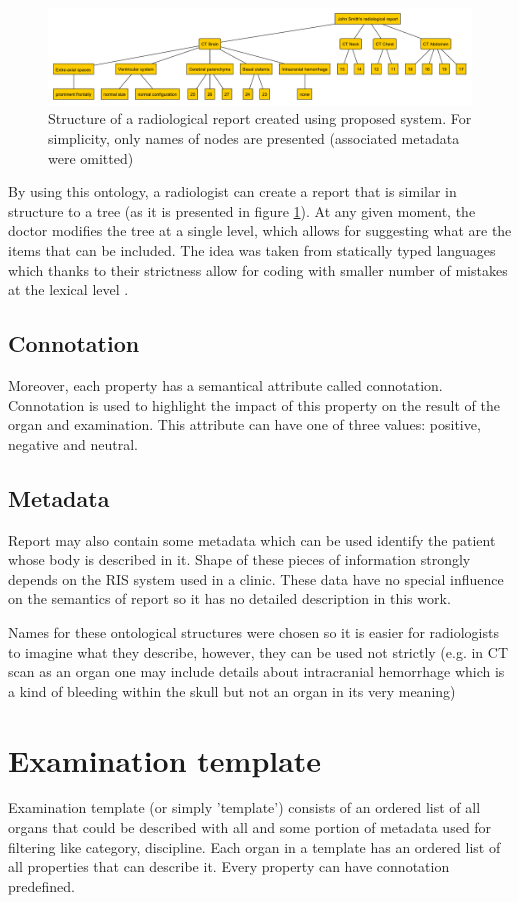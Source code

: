 \documentclass[12pt, twoside, openany]{report}
\theoremstyle{definition}
\begin{document}
\begin{figure}
    \centering
    \includegraphics[width=\linewidth]{report-tree.pdf}
    \caption{Structure of a radiological report created \label{fig:report-tree} using proposed system. For simplicity, only names of nodes are presented (associated metadata were omitted)}
\end{figure}

By using this ontology, a radiologist can create a report that is similar in structure to a tree (as it is presented in figure \ref{fig:report-tree}). At any given moment, the doctor modifies the tree at a single level, which allows for suggesting what are the items that can be included. The idea was taken from statically typed languages which thanks to their strictness allow for coding with smaller number of mistakes at the lexical level \cite{static-lang}.

\subsection{Connotation}
Moreover, each property has a semantical attribute called connotation. Connotation is used to highlight the impact of this property on the result of the organ and examination. This attribute can have one of three values: positive, negative and neutral. 
\subsection{Metadata}
Report may also contain some metadata which can be used identify the patient whose body is described in it. Shape of these pieces of information strongly depends on the RIS system used in a clinic. These data have no special influence on the semantics of report so it has no detailed description in this work.

Names for these ontological structures were chosen so it is easier for radiologists to imagine what they describe, however, they can be used not strictly (e.g. in CT scan as an organ one may include details about intracranial hemorrhage which is a kind of bleeding within the skull \cite{ich} but not an organ in its very meaning)

\section{Examination template}
Examination template (or simply 'template') consists of an ordered list of all organs that could be described with all and some portion of metadata used for filtering like category, discipline. Each organ in a template has an ordered list of all properties that can describe it. Every property can have connotation predefined. 
\end{document}
